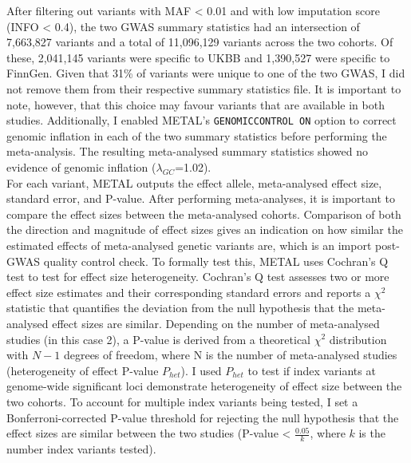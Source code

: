 After filtering out variants with MAF < 0.01 and with low imputation score (INFO < 0.4), the two GWAS summary statistics had an intersection of 7,663,827 variants and a total of 11,096,129 variants across the two cohorts. Of these, 2,041,145 variants were specific to UKBB and 1,390,527 were specific to FinnGen. Given that 31\% of variants were unique to one of the two GWAS, I did not remove them from their respective summary statistics file. It is important to note, however, that this choice may favour variants that are available in both studies. Additionally, I enabled METAL's \Verb+GENOMICCONTROL ON+ option to correct genomic inflation in each of the two summary statistics before performing the meta-analysis. The resulting meta-analysed summary statistics showed no evidence of genomic inflation ($\lambda_{GC}$=1.02).\\

For each variant, METAL outputs the effect allele, meta-analysed effect size, standard error, and P-value. After performing meta-analyses, it is important to compare the effect sizes between the meta-analysed cohorts. Comparison of both the direction and magnitude of effect sizes gives an indication on how similar the estimated effects of meta-analysed genetic variants are, which is an import post-GWAS quality control check. To formally test this, METAL uses Cochran's Q test to test for effect size heterogeneity. Cochran's Q test assesses two or more effect size estimates and their corresponding standard errors and reports a $\chi^{2}$ statistic that quantifies the deviation from the null hypothesis that the meta-analysed effect sizes are similar. Depending on the number of meta-analysed studies (in this case 2), a P-value is derived from a theoretical $\chi^{2}$ distribution with $N-1$ degrees of freedom, where N is the number of meta-analysed studies (heterogeneity of effect P-value $P_{het}$). I used $P_{het}$ to test if index variants at genome-wide significant loci demonstrate heterogeneity of effect size between the two cohorts. To account for multiple index variants being tested, I set a Bonferroni-corrected P-value threshold for rejecting the null hypothesis that the effect sizes are similar between the two studies (P-value < $\frac{0.05}{k}$, where $k$ is the number index variants tested).


